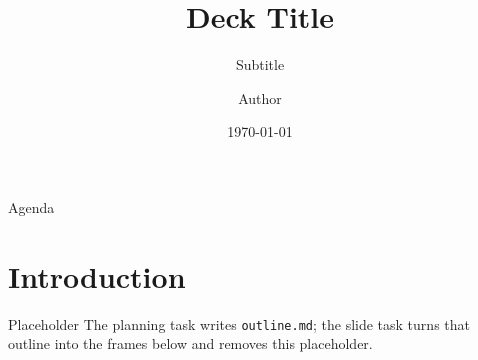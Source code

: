 \documentclass[aspectratio=169, 11pt]{beamer}
\title{Deck Title}
\subtitle{Subtitle}
\author{Author}
\date{\today}
\begin{document}
\maketitle

\begin{frame}{Agenda}
  \tableofcontents
\end{frame}

\section{Introduction}

\begin{frame}{Placeholder}
  The planning task writes \texttt{outline.md}; the slide task turns that outline
  into the frames below and removes this placeholder.
\end{frame}
\end{document}
